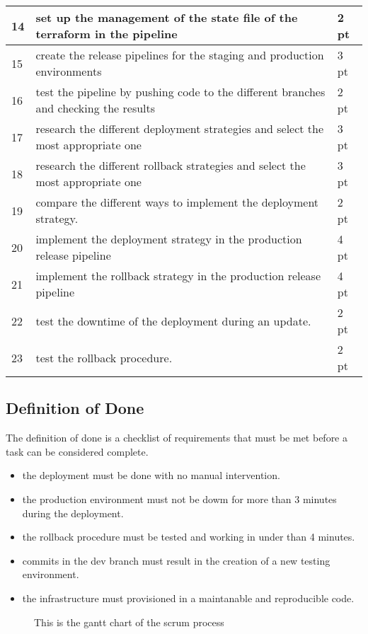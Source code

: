 \begin{longtable}[c]{
    |p{}
    |p{}|
    p{}|
    }
    14 & set up the management of the state file of the terraform in the pipeline & 2 pt \\ \hline
    15 & create the release pipelines for the staging and production environments & 3 pt \\ \hline
    16 & test the pipeline by pushing code to the different branches and checking the results & 2 pt \\ \hline
    17 & research the different deployment strategies and select the most appropriate one & 3 pt \\ \hline
    18 & research the different rollback strategies and select the most appropriate one & 3 pt \\ \hline
    19 & compare the different ways to implement the deployment strategy. & 2 pt \\ \hline
    20 & implement the deployment strategy in the production release pipeline & 4 pt \\ \hline
    21 & implement the rollback strategy in the production release pipeline & 4 pt \\ \hline
    22 & test the downtime of the deployment during an update. & 2 pt \\ \hline
    23 & test the rollback procedure. & 2 pt \\ \hline
\end{longtable}

\subsection{Definition of Done}
The definition of done is a checklist of requirements that must be met before a task can be considered complete. 

\begin{itemize}
    \item the deployment must be done with no manual intervention.
    \item the production environment must not be dowm for more than 3 minutes during the deployment.
    \item the rollback procedure must be tested and working in under than 4 minutes.
    \item commits in the dev branch must result in the creation of a new testing environment.
    \item the infrastructure must provisioned in a maintanable and reproducible code.
\end{itemize}

\begin{figure}
    \centering
    \caption{This is the gantt chart of the scrum process}
    \label{fig:gantt_chart}
\end{figure}

